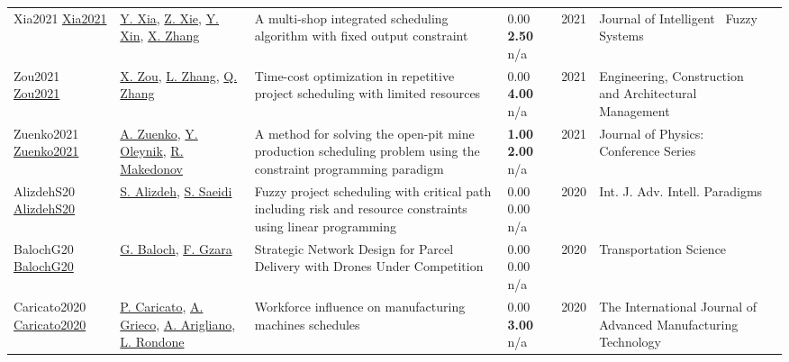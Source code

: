 {\begin{longtable}{p{3cm}p{5cm}p{10cm}p{1cm}rp{2.5cm}l}
Xia2021 \href{http://dx.doi.org/10.3233/jifs-189721}{Xia2021} & \hyperref[auth:a1540]{Y. Xia}, \hyperref[auth:a1541]{Z. Xie}, \hyperref[auth:a1542]{Y. Xin}, \hyperref[auth:a1543]{X. Zhang} & A multi-shop integrated scheduling algorithm with fixed output constraint & \noindent{}\textcolor{black!50}{0.00} \textbf{2.50} n/a & 2021 & Journal of Intelligent \  Fuzzy Systems & \cite{Xia2021}\\
Zou2021 \href{http://dx.doi.org/10.1108/ecam-10-2020-0843}{Zou2021} & \hyperref[auth:a756]{X. Zou}, \hyperref[auth:a757]{L. Zhang}, \hyperref[auth:a1483]{Q. Zhang} & Time-cost optimization in repetitive project scheduling with limited resources & \noindent{}\textcolor{black!50}{0.00} \textbf{4.00} n/a & 2021 & Engineering, Construction and Architectural Management & \cite{Zou2021}\\
Zuenko2021 \href{http://dx.doi.org/10.1088/1742-6596/2060/1/012021}{Zuenko2021} & \hyperref[auth:a1994]{A. Zuenko}, \hyperref[auth:a1995]{Y. Oleynik}, \hyperref[auth:a1996]{R. Makedonov} & \cellcolor{gold!20}A method for solving the open-pit mine production scheduling problem using the constraint programming paradigm & \noindent{}\textbf{1.00} \textbf{2.00} n/a & 2021 & Journal of Physics: Conference Series & \cite{Zuenko2021}\\
AlizdehS20 \href{https://doi.org/10.1504/IJAIP.2020.106687}{AlizdehS20} & \hyperref[auth:a513]{S. Alizdeh}, \hyperref[auth:a514]{S. Saeidi} & Fuzzy project scheduling with critical path including risk and resource constraints using linear programming & \noindent{}\textcolor{black!50}{0.00} \textcolor{black!50}{0.00} n/a & 2020 & \cellcolor{red!20}Int. J. Adv. Intell. Paradigms & \cite{AlizdehS20}\\
BalochG20 \href{http://dx.doi.org/10.1287/trsc.2019.0928}{BalochG20} & \hyperref[auth:a1237]{G. Baloch}, \hyperref[auth:a1238]{F. Gzara} & Strategic Network Design for Parcel Delivery with Drones Under Competition & \noindent{}\textcolor{black!50}{0.00} \textcolor{black!50}{0.00} n/a & 2020 & \cellcolor{red!20}Transportation Science & \cite{BalochG20}\\
Caricato2020 \href{http://dx.doi.org/10.1007/s00170-020-06176-y}{Caricato2020} & \hyperref[auth:a1499]{P. Caricato}, \hyperref[auth:a1500]{A. Grieco}, \hyperref[auth:a1501]{A. Arigliano}, \hyperref[auth:a1502]{L. Rondone} & \cellcolor{gold!20}Workforce influence on manufacturing machines schedules & \noindent{}\textcolor{black!50}{0.00} \textbf{3.00} n/a & 2020 & The International Journal of Advanced Manufacturing Technology & \cite{Caricato2020}\\

\end{longtable}}
